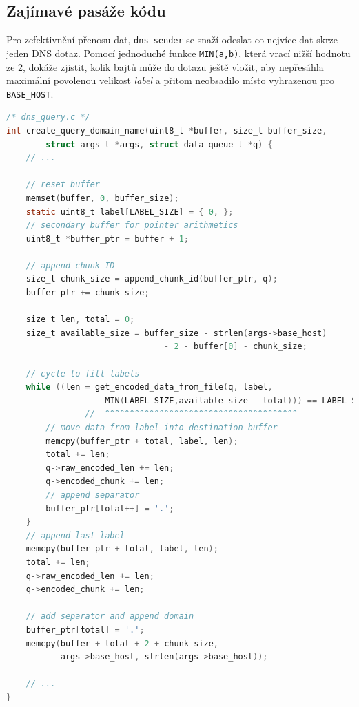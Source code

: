 \documentclass[a4paper,11pt]{article}
\begin{document}
    \subsection{Zajímavé pasáže kódu}
    Pro zefektivnění přenosu dat, \verb|dns_sender| se snaží odeslat co nejvíce dat skrze jeden DNS dotaz.
    Pomocí jednoduché funkce \verb|MIN(a,b)|, která vrací nižší hodnotu ze 2, dokáže zjistit, kolik bajtů
    může do dotazu ještě vložit, aby nepřesáhla maximální povolenou velikost \emph{label} a přitom neobsadilo místo
    vyhrazenou pro \verb|BASE_HOST|.
    \begin{lstlisting}[language=C,
                       backgroundcolor=\color{gray},
                       keywordstyle=\color{darkred},
                       commentstyle=\color{blue},
                       basicstyle=\ttfamily\footnotesize,
                       breaklines=true,
                       showstringspaces=false]
/* dns_query.c */
int create_query_domain_name(uint8_t *buffer, size_t buffer_size,
        struct args_t *args, struct data_queue_t *q) {
    // ...

    // reset buffer
    memset(buffer, 0, buffer_size);
    static uint8_t label[LABEL_SIZE] = { 0, };
    // secondary buffer for pointer arithmetics
    uint8_t *buffer_ptr = buffer + 1;

    // append chunk ID
    size_t chunk_size = append_chunk_id(buffer_ptr, q);
    buffer_ptr += chunk_size;

    size_t len, total = 0;
    size_t available_size = buffer_size - strlen(args->base_host)
                                - 2 - buffer[0] - chunk_size;

    // cycle to fill labels
    while ((len = get_encoded_data_from_file(q, label,
                    MIN(LABEL_SIZE,available_size - total))) == LABEL_SIZE) {
                //  ^^^^^^^^^^^^^^^^^^^^^^^^^^^^^^^^^^^^^^^
        // move data from label into destination buffer
        memcpy(buffer_ptr + total, label, len);
        total += len;
        q->raw_encoded_len += len;
        q->encoded_chunk += len;
        // append separator
        buffer_ptr[total++] = '.';
    }
    // append last label
    memcpy(buffer_ptr + total, label, len);
    total += len;
    q->raw_encoded_len += len;
    q->encoded_chunk += len;

    // add separator and append domain
    buffer_ptr[total] = '.';
    memcpy(buffer + total + 2 + chunk_size,
           args->base_host, strlen(args->base_host));

    // ...
}
    \end{lstlisting}
\end{document}
